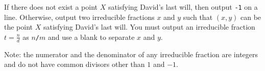If there does not exist a point $X$ satisfying David's last will, then output \verb+-1+
on a line. Otherwise, output two irreducible fractions $x$ and $y$ such that 
$(x,y)$ can be the point $X$ satisfying David's last will. 
You must output an irreducible fraction $t=\frac{n}{d}$ as $n$\verb+/+$m$ and
use a blank to separate $x$ and $y$.

Note: the numerator and the denominator of any irreducible fraction are integers
and do not have common divisors other than $1$ and $-1$.

